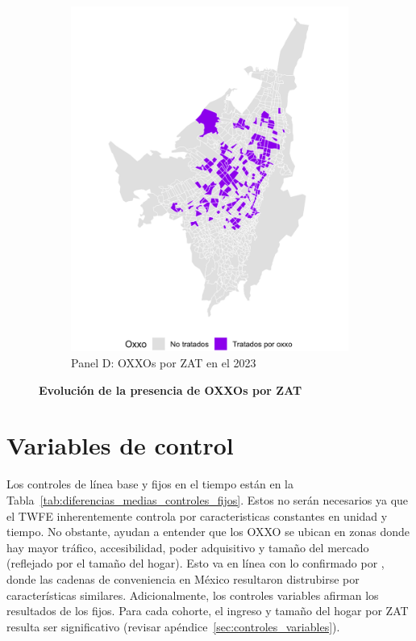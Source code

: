 \documentclass{article}
\begin{document}
\begin{figure} [H]
\begin{subfigure}[b]{0.4\textwidth}
        \includegraphics[width=\linewidth]{figs_oxxo_maps/mapa_oxxos_binary_2023.png}
        \caption{Panel D: OXXOs por ZAT en el 2023}
        \label{fig:panelD}
    \end{subfigure}
    
    \caption{
        \textbf{Evolución de la presencia de OXXOs por ZAT}
    }
    \label{fig:fourpanelOXXO}
\end{figure}


\section{Variables de control}

Los controles de línea base y fijos en el tiempo están en la Tabla~\ref{tab:diferencias_medias_controles_fijos}. Estos no serán necesarios ya que el TWFE inherentemente controla por caracteristicas constantes en unidad y tiempo. No obstante, ayudan a entender que los OXXO se ubican en zonas donde hay mayor tráfico, accesibilidad, poder adquisitivo y tamaño del mercado (reflejado por el tamaño del hogar). Esto va en línea con lo confirmado por \textcite{marcos2022}, donde las cadenas de conveniencia en México resultaron distrubirse por características similares.  Adicionalmente, los controles variables afirman los resultados de los fijos. Para cada cohorte, el ingreso y tamaño del hogar por ZAT resulta ser significativo (revisar apéndice~\ref{sec:controles_variables}). \\
\end{document}
